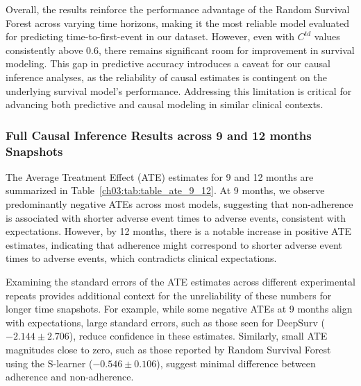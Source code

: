 


Overall, the results reinforce the performance advantage of the Random Survival Forest across varying time horizons, making it the most reliable model evaluated for predicting time-to-first-event in our dataset.
However, even with \(C^{td}\) values consistently above 0.6, there remains significant room for improvement in survival modeling.
This gap in predictive accuracy introduces a caveat for our causal inference analyses, as the reliability of causal estimates is contingent on the underlying survival model's performance.
Addressing this limitation is critical for advancing both predictive and causal modeling in similar clinical contexts.

\subsubsection{Full Causal Inference Results across 9 and 12 months Snapshots}
\label{ch03:apd:causal_inference}





The Average Treatment Effect (ATE) estimates for 9 and 12 months are summarized in Table~\ref{ch03:tab:table_ate_9_12}.
At 9 months, we observe predominantly negative ATEs across most models, suggesting that non-adherence is associated with shorter adverse event times to adverse events, consistent with expectations.
However, by 12 months, there is a notable increase in positive ATE estimates, indicating that adherence might correspond to shorter adverse event times to adverse events, which contradicts clinical expectations.

Examining the standard errors of the ATE estimates across different experimental repeats provides additional context for the unreliability of these numbers for longer time snapshots.
For example, while some negative ATEs at 9 months align with expectations, large standard errors, such as those seen for DeepSurv (\(-2.144 \pm 2.706\)), reduce confidence in these estimates.
Similarly, small ATE magnitudes close to zero, such as those reported by Random Survival Forest using the S-learner (\(-0.546 \pm 0.106\)), suggest minimal difference between adherence and non-adherence.


